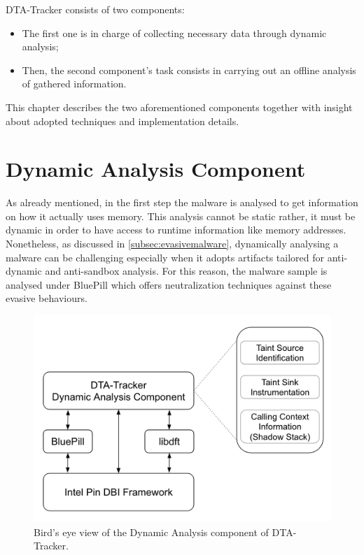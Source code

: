 \documentclass[LaM,binding=0.6cm]{sapthesis}
\begin{document}
DTA-Tracker consists of two components: 
\begin{itemize}
\item The first one is in charge of collecting necessary data through dynamic analysis;
\item Then, the second component's task consists in carrying out an offline analysis of gathered information.
\end{itemize}
This chapter describes the two aforementioned components together with insight about adopted techniques and implementation details.

\section{Dynamic Analysis Component}
As already mentioned, in the first step the malware is analysed to get information on how it actually uses memory. This analysis cannot be static rather, it must be dynamic in order to have access to runtime information like memory addresses.\\
Nonetheless, as discussed in \autoref{subsec:evasivemalware}, dynamically analysing a malware can be challenging especially when it adopts artifacts tailored for anti-dynamic and anti-sandbox analysis. For this reason, the malware sample is analysed under BluePill which offers neutralization techniques against these evasive behaviours.

\begin{figure}[h!]
\centering
\includegraphics[scale=.6]{images/dtatracker1}
\caption{Bird's eye view of the Dynamic Analysis component of DTA-Tracker.}
\end{figure}
\newpage
\end{document}
